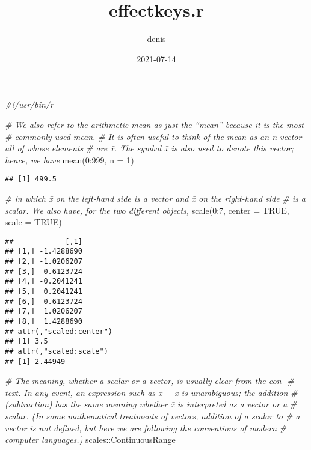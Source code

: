 \documentclass[
]{article}
\title{effectkeys.r}
\author{denis}
\date{2021-07-14}
\newenvironment{Shaded}{\begin{snugshade}}{\end{snugshade}}
\newcommand{\AttributeTok}[1]{\textcolor[rgb]{0.77,0.63,0.00}{#1}}
\newcommand{\CommentTok}[1]{\textcolor[rgb]{0.56,0.35,0.01}{\textit{#1}}}
\newcommand{\ConstantTok}[1]{\textcolor[rgb]{0.00,0.00,0.00}{#1}}
\newcommand{\DecValTok}[1]{\textcolor[rgb]{0.00,0.00,0.81}{#1}}
\newcommand{\FunctionTok}[1]{\textcolor[rgb]{0.00,0.00,0.00}{#1}}
\newcommand{\NormalTok}[1]{#1}
\newcommand{\SpecialCharTok}[1]{\textcolor[rgb]{0.00,0.00,0.00}{#1}}
\begin{document}
\maketitle

\begin{Shaded}
\begin{Highlighting}[]
\CommentTok{\#!/usr/bin/r}

\CommentTok{\# We also refer to the arithmetic mean as just the “mean” because it is the most}
\CommentTok{\# commonly used mean.}
\CommentTok{\# It is often useful to think of the mean as an n{-}vector all of whose elements}
\CommentTok{\# are x̄. The symbol x̄ is also used to denote this vector; hence, we have}
\FunctionTok{mean}\NormalTok{(}\DecValTok{0}\SpecialCharTok{:}\DecValTok{999}\NormalTok{, }\AttributeTok{n =} \DecValTok{1}\NormalTok{)}
\end{Highlighting}
\end{Shaded}

\begin{verbatim}
## [1] 499.5
\end{verbatim}

\begin{Shaded}
\begin{Highlighting}[]
\CommentTok{\# in which x̄ on the left{-}hand side is a vector and x̄ on the right{-}hand side}
\CommentTok{\# is a scalar. We also have, for the two diﬀerent objects,}
\FunctionTok{scale}\NormalTok{(}\DecValTok{0}\SpecialCharTok{:}\DecValTok{7}\NormalTok{, }\AttributeTok{center =} \ConstantTok{TRUE}\NormalTok{, }\AttributeTok{scale =} \ConstantTok{TRUE}\NormalTok{)}
\end{Highlighting}
\end{Shaded}

\begin{verbatim}
##            [,1]
## [1,] -1.4288690
## [2,] -1.0206207
## [3,] -0.6123724
## [4,] -0.2041241
## [5,]  0.2041241
## [6,]  0.6123724
## [7,]  1.0206207
## [8,]  1.4288690
## attr(,"scaled:center")
## [1] 3.5
## attr(,"scaled:scale")
## [1] 2.44949
\end{verbatim}

\begin{Shaded}
\begin{Highlighting}[]
\CommentTok{\# The meaning, whether a scalar or a vector, is usually clear from the con{-}}
\CommentTok{\# text. In any event, an expression such as x − x̄ is unambiguous; the addition}
\CommentTok{\# (subtraction) has the same meaning whether x̄ is interpreted as a vector or a}
\CommentTok{\# scalar. (In some mathematical treatments of vectors, addition of a scalar to}
\CommentTok{\# a vector is not deﬁned, but here we are following the conventions of modern}
\CommentTok{\# computer languages.)}
\NormalTok{scales}\SpecialCharTok{::}\NormalTok{ContinuousRange}
\end{Highlighting}
\end{Shaded}
\end{document}
